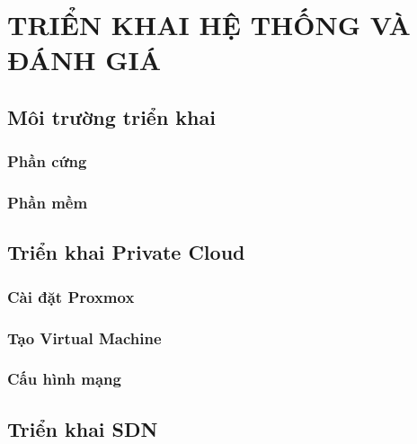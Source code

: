 \section{TRIỂN KHAI HỆ THỐNG VÀ ĐÁNH GIÁ}\label{sec:trien_khai_danh_gia}

\subsection{Môi trường triển khai}

\subsubsection{Phần cứng}

\subsubsection{Phần mềm}

\subsection{Triển khai Private Cloud}

\subsubsection{Cài đặt Proxmox}

\subsubsection{Tạo Virtual Machine}

\subsubsection{Cấu hình mạng}

\subsection{Triển khai SDN}

